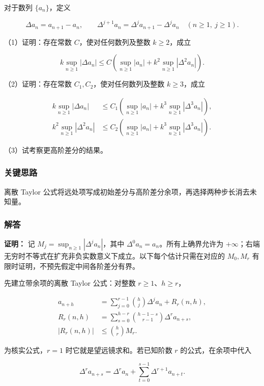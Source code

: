 \documentclass[11pt,a4paper]{article}
\begin{document}
对于数列 \(\{a_n\}\)，定义

\[
\Delta a_n=a_{n+1}-a_n,\qquad
\Delta^{j+1}a_n=\Delta^ja_{n+1}-\Delta^ja_n
\quad(n\ge1,\ j\ge1).
\]

（1）证明：存在常数 \(C\)，使对任何数列及整数 \(k\ge2\)，成立

\[
k\sup_{n\ge1}|\Delta a_n|
\le C\left(\sup_{n\ge1}|a_n|+k^2\sup_{n\ge1}|\Delta^2a_n|\right).
\]

（2）证明：存在常数 \(C_1,C_2\)，使对任何数列及整数 \(k\ge3\)，成立

\[
\begin{aligned}
k\sup_{n\ge1}|\Delta a_n|
&\le C_1\left(\sup_{n\ge1}|a_n|+k^3\sup_{n\ge1}|\Delta^3a_n|\right),\\
k^2\sup_{n\ge1}|\Delta^2a_n|
&\le C_2\left(\sup_{n\ge1}|a_n|+k^3\sup_{n\ge1}|\Delta^3a_n|\right).
\end{aligned}
\]

（3）试考察更高阶差分的结果。

\subsubsection{关键思路}\label{ux5173ux952eux601dux8def-26}

离散 Taylor
公式将远处项写成初始差分与高阶差分余项，再选择两种步长消去未知量。

\subsubsection{解答}\label{ux89e3ux7b54-26}

\textbf{证明：} 记 \(M_j=\sup_{n\ge1}|\Delta^ja_n|\)，其中
\(\Delta^0a_n=a_n\)。所有上确界允许为
\(+\infty\)；右端无穷时不等式在扩充非负实数意义下成立。以下每个估计只需在对应的
\(M_0,M_r\) 有限时证明，不预先假定中间各阶差分有界。

先建立带余项的离散 Taylor 公式：对整数 \(r\ge1\)、\(h\ge r\)，

\[
\begin{aligned}
a_{n+h}
&=\sum_{j=0}^{r-1}\binom hj\Delta^ja_n+R_r(n,h),\\
R_r(n,h)
&=\sum_{s=0}^{h-r}\binom{h-1-s}{r-1}\Delta^ra_{n+s},\\
|R_r(n,h)|&\le\binom hr M_r.
\end{aligned}
\]

为核实公式，\(r=1\) 时它就是望远镜求和。若已知阶数 \(r\)
的公式，在余项中代入

\[
\Delta^ra_{n+s}=\Delta^ra_n+\sum_{t=0}^{s-1}\Delta^{r+1}a_{n+t}.
\]
\end{document}
